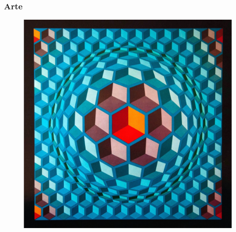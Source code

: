 \documentclass[14pt]{beamer}
\begin{document}
\begin{frame}
\frametitle{Arte}
\begin{figure}
    \centering
    \includegraphics[scale=0.1]{Imagenes/Mosaico_Hexagonal.jpg}
\end{figure}
\end{frame}
\end{document}
